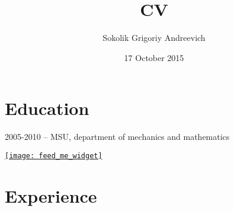 \documentclass[10pt, a4paper, english]{article}
\title {CV}
\author{Sokolik Grigoriy Andreevich}
\date {17 October 2015}
\begin{document}
\maketitle


\section* {Education}
\begin {list}{\textbullet}{}
\item 2005-2010 -- MSU, department of mechanics and mathematics
\item \href{http://php.feedme.ru/widget.php?code=puyg9l1a8qx4f3scrbtgedm5j60hzw2v}{\texttt{[image: feed\_me\_widget]}}
\end {list}


\section* {Experience}
\end{document}
